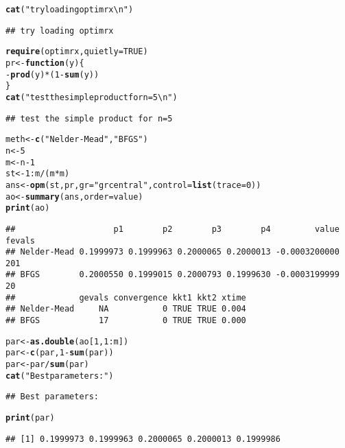 \documentclass[11pt]{article}\usepackage[]{graphicx}\usepackage[]{color}
\makeatletter
\newcommand{\hlnum}[1]{\textcolor[rgb]{0.686,0.059,0.569}{#1}}%
\newcommand{\hlstr}[1]{\textcolor[rgb]{0.192,0.494,0.8}{#1}}%
\newcommand{\hlopt}[1]{\textcolor[rgb]{0,0,0}{#1}}%
\newcommand{\hlstd}[1]{\textcolor[rgb]{0.345,0.345,0.345}{#1}}%
\newcommand{\hlkwa}[1]{\textcolor[rgb]{0.161,0.373,0.58}{\textbf{#1}}}%
\newcommand{\hlkwb}[1]{\textcolor[rgb]{0.69,0.353,0.396}{#1}}%
\newcommand{\hlkwc}[1]{\textcolor[rgb]{0.333,0.667,0.333}{#1}}%
\newcommand{\hlkwd}[1]{\textcolor[rgb]{0.737,0.353,0.396}{\textbf{#1}}}%
\newenvironment{kframe}{%
 \def\at@end@of@kframe{}%
 \ifinner\ifhmode%
  \def\at@end@of@kframe{\end{minipage}}%
  \begin{minipage}{\columnwidth}%
 \fi\fi%
 \def\FrameCommand##1{\hskip\@totalleftmargin \hskip-\fboxsep
 \colorbox{shadecolor}{##1}\hskip-\fboxsep
     \hskip-\linewidth \hskip-\@totalleftmargin \hskip\columnwidth}%
 \MakeFramed {\advance\hsize-\width
   \@totalleftmargin\z@ \linewidth\hsize
   \@setminipage}}%
 {\par\unskip\endMakeFramed%
 \at@end@of@kframe}
\newenvironment{knitrout}{}{} %
\makeatother
\begin{document}
\begin{knitrout}\scriptsize
{}\color{fgcolor}\begin{kframe}
\begin{alltt}
\hlkwd{cat}\hlstd{(}\hlstr{"try loading optimrx\textbackslash{}n"}\hlstd{)}
\end{alltt}
\begin{verbatim}
## try loading optimrx
\end{verbatim}
\begin{alltt}
\hlkwd{require}\hlstd{(optimrx,} \hlkwc{quietly}\hlstd{=}\hlnum{TRUE}\hlstd{)}
\hlstd{pr} \hlkwb{<-} \hlkwa{function}\hlstd{(}\hlkwc{y}\hlstd{) \{}
\hlopt{-} \hlkwd{prod}\hlstd{(y)}\hlopt{*}\hlstd{(}\hlnum{1}\hlopt{-}\hlkwd{sum}\hlstd{(y))}
\hlstd{\}}
\hlkwd{cat}\hlstd{(}\hlstr{"test the simple product for n=5\textbackslash{}n"}\hlstd{)}
\end{alltt}
\begin{verbatim}
## test the simple product for n=5
\end{verbatim}
\begin{alltt}
\hlstd{meth} \hlkwb{<-} \hlkwd{c}\hlstd{(}\hlstr{"Nelder-Mead"}\hlstd{,} \hlstr{"BFGS"}\hlstd{)}
\hlstd{n}\hlkwb{<-}\hlnum{5}
\hlstd{m}\hlkwb{<-}\hlstd{n}\hlopt{-}\hlnum{1}
  \hlstd{st}\hlkwb{<-}\hlnum{1}\hlopt{:}\hlstd{m}\hlopt{/}\hlstd{(m}\hlopt{*}\hlstd{m)}
   \hlstd{ans}\hlkwb{<-}\hlkwd{opm}\hlstd{(st, pr,} \hlkwc{gr}\hlstd{=}\hlstr{"grcentral"}\hlstd{,} \hlkwc{control}\hlstd{=}\hlkwd{list}\hlstd{(}\hlkwc{trace}\hlstd{=}\hlnum{0}\hlstd{))}
   \hlstd{ao}\hlkwb{<-}\hlkwd{summary}\hlstd{(ans,}\hlkwc{order}\hlstd{=value)}
\hlkwd{print}\hlstd{(ao)}
\end{alltt}
\begin{verbatim}
##                    p1        p2        p3        p4         value fevals
## Nelder-Mead 0.1999973 0.1999963 0.2000065 0.2000013 -0.0003200000    201
## BFGS        0.2000550 0.1999015 0.2000793 0.1999630 -0.0003199999     20
##             gevals convergence kkt1 kkt2 xtime
## Nelder-Mead     NA           0 TRUE TRUE 0.004
## BFGS            17           0 TRUE TRUE 0.000
\end{verbatim}
\begin{alltt}
\hlstd{par} \hlkwb{<-} \hlkwd{as.double}\hlstd{(ao[}\hlnum{1}\hlstd{,}\hlnum{1}\hlopt{:}\hlstd{m])}
\hlstd{par} \hlkwb{<-} \hlkwd{c}\hlstd{(par,} \hlnum{1}\hlopt{-}\hlkwd{sum}\hlstd{(par))}
\hlstd{par} \hlkwb{<-} \hlstd{par}\hlopt{/}\hlkwd{sum}\hlstd{(par)}
\hlkwd{cat}\hlstd{(}\hlstr{"Best parameters:"}\hlstd{)}
\end{alltt}
\begin{verbatim}
## Best parameters:
\end{verbatim}
\begin{alltt}
\hlkwd{print}\hlstd{(par)}
\end{alltt}
\begin{verbatim}
## [1] 0.1999973 0.1999963 0.2000065 0.2000013 0.1999986
\end{verbatim}
\end{kframe}
\end{knitrout}
\end{document}
